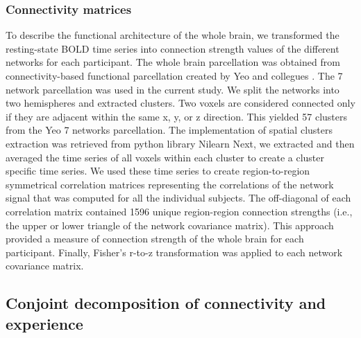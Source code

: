 \subsubsection{Connectivity matrices} 

To describe the functional architecture of the whole brain, we transformed the resting-state BOLD time series into connection strength values of the different networks for each participant. The whole brain parcellation was obtained from connectivity-based functional parcellation created by Yeo and collegues \citeyear{Yeo2011}. 
The 7 network parcellation was used in the current study. We split the networks into two hemispheres and extracted clusters. Two voxels are considered connected only if they are adjacent within the same x, y, or z direction. This yielded 57 clusters from the Yeo 7 networks parcellation. The implementation of spatial clusters extraction was retrieved from python library Nilearn \cite[\url{http://nilearn.github.io/}, version 0.3.1]{Abraham2014}
Next, we extracted and then averaged the time series of all voxels within each cluster to create a cluster specific time series. We used these time series to create region-to-region symmetrical correlation matrices representing the correlations of the network signal that was computed for all the individual subjects. The off-diagonal of each correlation matrix contained 1596 unique region-region connection strengths (i.e., the upper or lower triangle of the network covariance matrix). This approach provided a measure of connection strength of the whole brain for each participant. Finally, Fisher’s r-to-z transformation was applied to each network covariance matrix.

\subsection{Conjoint decomposition of connectivity and experience}
\label{study2:method:ML}

